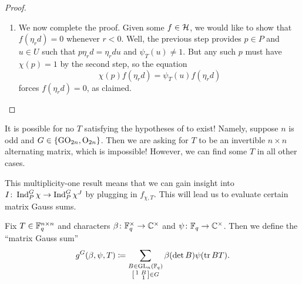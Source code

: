 \begin{proof}
\begin{enumerate}

		\item We now complete the proof. Given some $f\in\mathcal{H}$, we would like to show that $f(\eta_rd)=0$ whenever $r<0$. Well, the previous step provides $p\in P$ and $u\in U$ such that $p\eta_rd=\eta_rdu$ and $\psi_T(u)\ne1$. But any such $p$ must have $\chi(p)=1$ by the second step, so the equation
		\[\chi(p)f(\eta_rd)=\psi_T(u)f(\eta_rd)\]
		forces $f(\eta_rd)=0$, as claimed.
		\qedhere
	\end{enumerate}
\end{proof}
\begin{remark} \label{rem:bad-orthogonal}
	It is possible for no $T$ satisfying the hypotheses of  to exist! Namely, suppose $n$ is odd and $G\in\{\mathrm{GO}_{2n},\mathrm{O}_{2n}\}$. Then we are asking for $T$ to be an invertible $n\times n$ alternating matrix, which is impossible! However, we can find some $T$ in all other cases.
\end{remark}
This multiplicity-one result means that we can gain insight into $I\colon\operatorname{Ind}_P^G\chi\to\operatorname{Ind}_P^G\chi^J$ by plugging in $f_{\chi,T}$. This will lead us to evaluate certain matrix Gauss sums.
\begin{definition}
	Fix $T\in \mathbb F_q^{n\times n}$ and characters $\beta\colon\mathbb F_q^\times\to\mathbb C^\times$ and $\psi\colon\mathbb F_q\to\mathbb C^\times$. Then we define the ``matrix Gauss sum''
	\[g^G(\beta,\psi,T)\coloneqq\sum_{\substack{B\in\mathrm{GL}_n(\mathbb F_q)\\\begin{bsmallmatrix}
		1 & B \\ & 1
	\end{bsmallmatrix}\in G}}\beta(\det B)\psi(\operatorname{tr} BT).\]
\end{definition}
